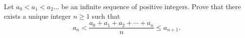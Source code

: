 Let $a_0 < a_1 < a_2 \ldots$ be an infinite sequence of positive integers.
Prove that there exists a unique integer $n\geq 1$ such that
\[a_n < \frac{a_0+a_1+a_2+\cdots+a_n}{n} \leq a_{n+1}.\]
